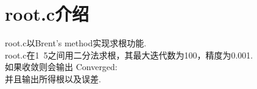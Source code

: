 \documentclass{ctexart}
\begin{document}
	\section{root.c介绍}
	root.c以Brent's method实现求根功能.\\
	root.c在1~5之间用二分法求根，其最大迭代数为100，精度为0.001.\\
	如果收敛则会输出 Converged:\\
	并且输出所得根以及误差.
\end{document}
